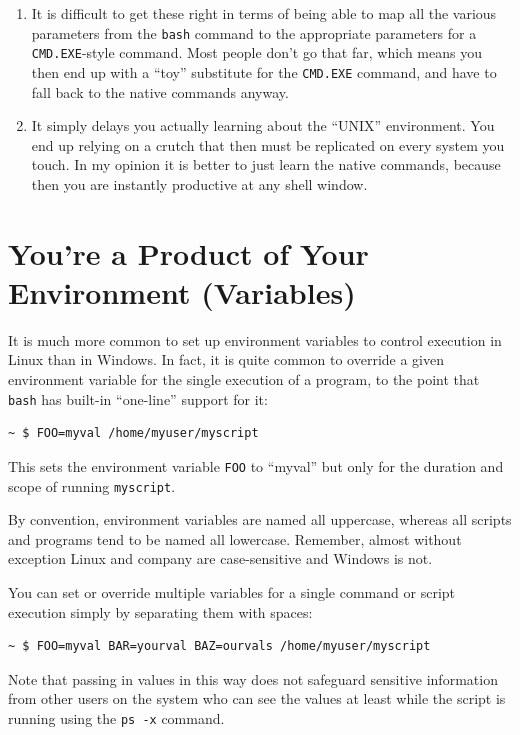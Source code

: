 \documentclass[10pt,]{book}
\numberwithin{figure}{chapter}
\begin{document}
\begin{enumerate}
\def\labelenumi{\arabic{enumi}.}
\item
  It is difficult to get these right in terms of being able to map all
  the various parameters from the \texttt{bash} command to the
  appropriate parameters for a \texttt{CMD.EXE}-style command. Most
  people don't go that far, which means you then end up with a ``toy''
  substitute for the \texttt{CMD.EXE} command, and have to fall back to
  the native commands anyway.
\item
  It simply delays you actually learning about the ``UNIX'' environment.
  You end up relying on a crutch that then must be replicated on every
  system you touch. In my opinion it is better to just learn the native
  commands, because then you are instantly productive at any shell
  window.
\end{enumerate}

\section{You're a Product of Your Environment
(Variables)}\label{youre-a-product-of-your-environment-variables}

It is much more common to set up environment variables to control
execution in Linux than in Windows. In fact, it is quite common to
override a given environment variable for the single execution of a
program, to the point that \texttt{bash} has built-in ``one-line''
support for it:

\begin{verbatim}
~ $ FOO=myval /home/myuser/myscript
\end{verbatim}

This sets the environment variable \texttt{FOO} to ``myval'' but only
for the duration and scope of running \texttt{myscript}.

By convention, environment variables are named all uppercase, whereas
all scripts and programs tend to be named all lowercase. Remember,
almost without exception Linux and company are case-sensitive and
Windows is not.

You can set or override multiple variables for a single command or
script execution simply by separating them with spaces:

\begin{verbatim}
~ $ FOO=myval BAR=yourval BAZ=ourvals /home/myuser/myscript
\end{verbatim}

Note that passing in values in this way does not safeguard sensitive
information from other users on the system who can see the values at
least while the script is running using the \texttt{ps -x} command.
\end{document}
